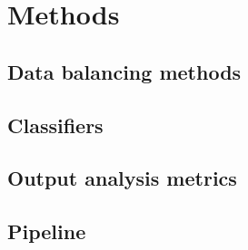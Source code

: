 \section{Methods}

\subsection{Data balancing methods}

\subsection{Classifiers}

\subsection{Output analysis metrics}

\subsection{Pipeline}
